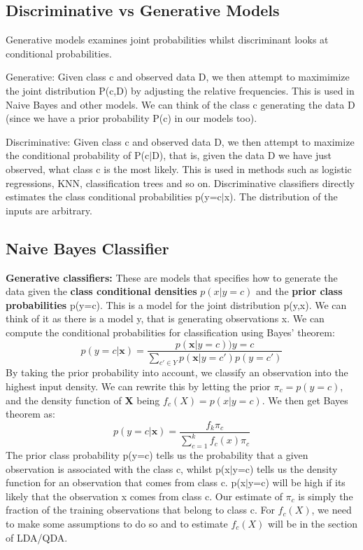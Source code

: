 \documentclass[11pt, oneside]{article}
\theoremstyle{definition}
\begin{document}
\subsection{Discriminative vs Generative Models}
Generative models examines joint probabilities whilst discriminant looks at conditional probabilities.

Generative: Given class c and observed data D, we then attempt to maximimize the joint distribution P(c,D) by adjusting the relative frequencies. This is used in Naive Bayes and other models. We can think of the class c generating the data D (since we have a prior probability P(c) in our models too).

Discriminative: Given class c and observed data D, we then attempt to maximize the conditional probability of P(c$|$D), that is, given the data D we have just observed, what class c is the most likely. This is used in methods such as logistic regressions, KNN, classification trees and so on. Discriminative classifiers directly estimates the class conditional probabilities p(y=c$|$x). The distribution of the inputs are arbitrary.

\subsection{Naive Bayes Classifier}
\textbf{Generative classifiers: } These are models that specifies how to generate the data given the \textbf{class conditional densities} $p(x|y=c)$ and the \textbf{prior class probabilities} p(y=c). This is a model for the joint distribution p(y,x). We can think of it as there is a model y, that is generating observations x. We can compute the conditional probabilities for classification using Bayes' theorem:
$$
p(y=c|\bm{x}) = \frac{p(\bm{x}|y=c))y=c}{\sum\limits_{c' \in Y}p(\bm{x}|y=c')p(y=c')}
$$
By taking the prior probability into account, we classify an observation into the highest input density. We can rewrite this by letting the prior $\pi_c = p(y=c)$, and the density function of \textbf{X} being $f_c(X) = p(x|y=c)$. We then get Bayes theorem as:
$$
p(y=c|\bm{x}) = \frac{f_k \pi_c}{\sum\limits_{c=1}^{k}f_c(x)\pi_c}
$$
The prior class probability p(y=c) tells us the probability that a given observation is associated with the class c, whilst p(x$|$y=c) tells us the density function for an observation that comes from class c. p(x$|$y=c) will be high if its likely that the observation x comes from class c. Our estimate of $\pi_c$ is simply the fraction of the training observations that belong to class c. For $f_c(X)$, we need to make some assumptions to do so and to estimate $f_c(X)$ will be in the section of LDA/QDA.
\end{document}
